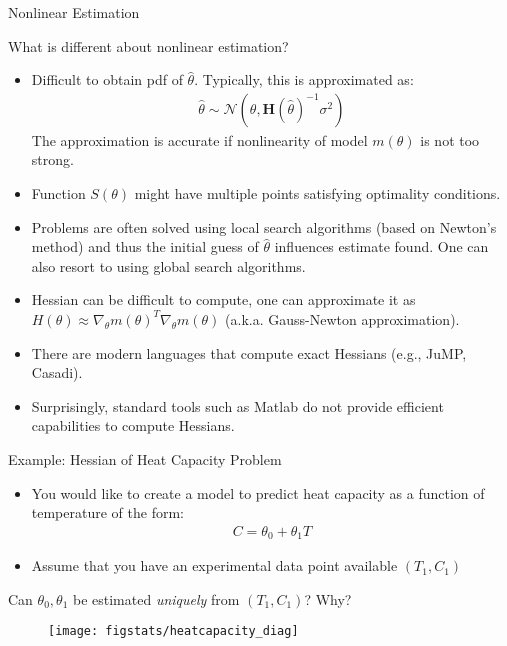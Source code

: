 \documentclass[9pt]{beamer}
\begin{document}
%
\begin{frame}{Nonlinear Estimation}

What is different about nonlinear estimation?
\begin{itemize}
\item  Difficult to obtain pdf of $\hat{\theta}$. Typically, this is approximated as:
\begin{align*}
\hat{\theta}\sim\mathcal{N}(\theta,\mathbf{H}(\hat{\theta})^{-1}\sigma^2)
\end{align*}
The approximation is accurate if nonlinearity of model $m(\theta)$ is not too strong. 
\item Function $S(\theta)$ might have multiple points satisfying optimality conditions.  
\item Problems are often solved using local search algorithms (based on Newton's method) and thus the initial guess of $\hat{\theta}$ influences estimate found.  One can also resort to using global search algorithms. 
\item Hessian can be difficult to compute, one can approximate it as $H(\theta)\approx \nabla_\theta m(\theta)^T\nabla_\theta m(\theta)$ (a.k.a. Gauss-Newton approximation).
\item There are modern languages that compute exact Hessians (e.g., JuMP, Casadi). 
\item Surprisingly, standard tools such as Matlab do not provide efficient capabilities to compute Hessians. 
\end{itemize}
\end{frame}

%
\begin{frame}{Example: Hessian of Heat Capacity Problem}

\begin{itemize}
\item You would like to create a model to predict heat capacity as a function of temperature of the form:
\begin{align*}
C=\theta_0+\theta_1 T
\end{align*}
\item Assume that you have an experimental data point available $(T_1,C_1)$
\end{itemize}
\begin{block}{}
\begin{center}
Can $\theta_0,\theta_1$ be estimated {\em uniquely} from $(T_1,C_1)$? Why? 
\end{center}
\end{block}
\pause
\begin{figure}[!htb]
    \centering
	\texttt{[image: figstats/heatcapacity\_diag]}
\end{figure}

\end{frame}
\end{document}
